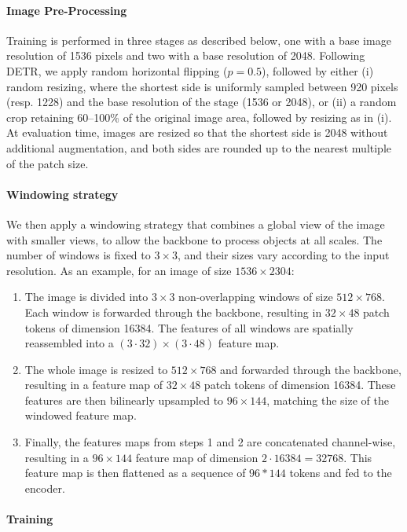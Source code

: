\paragraph{Image Pre-Processing}
Training is performed in three stages as described below, one with a base image resolution of 1536 pixels and two with a base resolution of 2048.
Following DETR, we apply random horizontal flipping ($p=0.5$), followed by either
(i) random resizing, where the shortest side is uniformly sampled between 920 pixels (resp. 1228) and the base resolution of the stage (1536 or 2048), or
(ii) a random crop retaining 60--100\% of the original image area, followed by resizing as in (i).
At evaluation time, images are resized so that the shortest side is 2048 without additional augmentation, and both sides are rounded up to the nearest multiple of the patch size.

\paragraph{Windowing strategy}
We then apply a windowing strategy that combines a global view of the image with smaller views, to allow the backbone to process objects at all scales. The number of windows is fixed to $3 \times 3$, and their sizes vary according to the input resolution.
As an example, for an image of size \(1536 \times 2304\):
\begin{enumerate}
    \item
    The image is divided into \(3 \times 3\) non-overlapping windows of size \(512 \times 768\).
    Each window is forwarded through the backbone, resulting in \(32 \times 48\) patch tokens of dimension 16384.
    The features of all windows are spatially reassembled into a \((3 \cdot 32) \times (3 \cdot 48)\) feature map.
    \item
    The whole image is resized to \(512{\times}768\) and forwarded through the backbone, resulting in a feature map of \(32{\times}48\) patch tokens of dimension 16384.
    These features are then bilinearly upsampled to \(96{\times}144\), matching the size of the windowed feature map.
    \item
    Finally, the features maps from steps 1 and 2 are concatenated channel-wise, resulting in a \(96{\times}144\) feature map of dimension \(2 \cdot 16384 = 32768\).
    This feature map is then flattened as a sequence of \(96*144\) tokens and fed to the encoder.
\end{enumerate}

\paragraph{Training}

